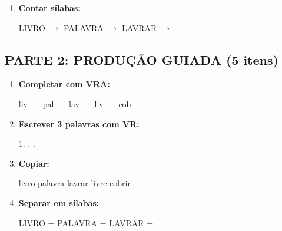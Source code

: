\begin{exercicio}
\begin{enumerate}
  \item \textbf{Contar sílabas:}
  \begin{center}
  LIVRO $\rightarrow$ \underline{\hspace{0.9cm}} \quad PALAVRA $\rightarrow$ \underline{\hspace{0.9cm}} \quad LAVRAR $\rightarrow$ \underline{\hspace{0.9cm}}
  \end{center}

\end{enumerate}

\subsection*{PARTE 2: PRODUÇÃO GUIADA (5 itens)}

\begin{enumerate}[resume]

  \item \textbf{Completar com VRA:}
  \begin{center}
  liv\underline{~~~} \quad pal\underline{~~~} \quad lav\underline{~~~} \quad liv\underline{~~~} \quad cob\underline{~~~}
  \end{center}

  \item \textbf{Escrever 3 palavras com VR:}
  \begin{center}
  1. \underline{\hspace{3cm}} . \underline{\hspace{3cm}} . \underline{\hspace{3cm}}
  \end{center}

  \item \textbf{Copiar:}
  \begin{center}
  livro \quad palavra \quad lavrar \quad livre \quad cobrir
  \end{center}

  \item \textbf{Separar em sílabas:}
  \begin{center}
  LIVRO = \underline{\hspace{1cm}} \underline{\hspace{1cm}} \quad PALAVRA = \underline{\hspace{1cm}} \underline{\hspace{1cm}} \quad LAVRAR = \underline{\hspace{1cm}} \underline{\hspace{1cm}}
  \end{center}


\end{enumerate}
\end{exercicio}
